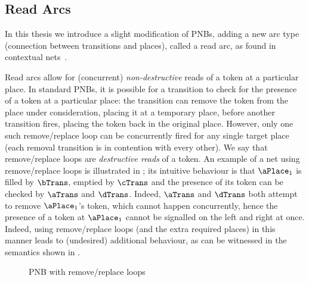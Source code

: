 \subsection{Read Arcs}\label{sec:PNBReadArcs}

In this thesis we introduce a slight modification of PNBs, adding a new arc
type (connection between transitions and places), called a read arc, as found
in contextual nets~\cite{Christensen1993}.

Read arcs allow for (concurrent) \emph{non-destructive} reads of a token at a
particular place. In standard PNBs, it is possible for a transition to check
for the presence of a token at a particular place: the transition can remove
the token from the place under consideration, placing it at a temporary
place, before another transition fires, placing the token back in the original
place. However, only one such remove/replace loop can be concurrently fired for
any single target place (each removal transition is in contention with every
other). We say that remove/replace loops are \emph{destructive reads} of a
token. An example of a net using remove/replace loops is illustrated in
; its intuitive behaviour is that $\aPlace_1$ is
filled by $\bTrans$, emptied by $\cTrans$ and the presence of its token
can be checked by $\aTrans$ and $\dTrans$. Indeed, $\aTrans$ and $\dTrans$ both
attempt to remove $\aPlace_1$'s token, which cannot happen concurrently, hence
the presence of a token at $\aPlace_1$ cannot be signalled on the left and
right at once. Indeed, using remove/replace loops (and the extra required
places) in this manner leads to (undesired) additional behaviour, as can be
witnessed in the \TLTS{} semantics shown in .

\begin{figure}[ht]
\centering
{}
\caption{PNB with remove/replace loops}
\label{fig:removeReplaceLoops}
\end{figure}

